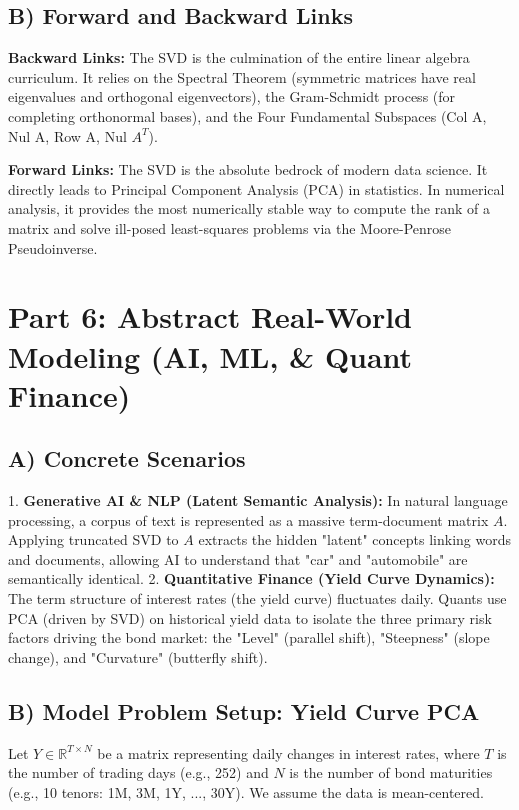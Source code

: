 \documentclass[11pt, letterpaper]{article}
\theoremstyle{definition}
\theoremstyle{remark}
\newcommand{\R}{\mathbb{R}}
\begin{document}
\subsection{B) Forward and Backward Links}
\textbf{Backward Links:} The SVD is the culmination of the entire linear algebra curriculum. It relies on the Spectral Theorem (symmetric matrices have real eigenvalues and orthogonal eigenvectors), the Gram-Schmidt process (for completing orthonormal bases), and the Four Fundamental Subspaces (Col A, Nul A, Row A, Nul $A^T$).

\textbf{Forward Links:} The SVD is the absolute bedrock of modern data science. It directly leads to Principal Component Analysis (PCA) in statistics. In numerical analysis, it provides the most numerically stable way to compute the rank of a matrix and solve ill-posed least-squares problems via the Moore-Penrose Pseudoinverse.

\newpage
\section{Part 6: Abstract Real-World Modeling (AI, ML, \& Quant Finance)}

\subsection{A) Concrete Scenarios}
1. \textbf{Generative AI \& NLP (Latent Semantic Analysis):} In natural language processing, a corpus of text is represented as a massive term-document matrix $A$. Applying truncated SVD to $A$ extracts the hidden "latent" concepts linking words and documents, allowing AI to understand that "car" and "automobile" are semantically identical.
2. \textbf{Quantitative Finance (Yield Curve Dynamics):} The term structure of interest rates (the yield curve) fluctuates daily. Quants use PCA (driven by SVD) on historical yield data to isolate the three primary risk factors driving the bond market: the "Level" (parallel shift), "Steepness" (slope change), and "Curvature" (butterfly shift).

\subsection{B) Model Problem Setup: Yield Curve PCA}
Let $Y \in \R^{T \times N}$ be a matrix representing daily changes in interest rates, where $T$ is the number of trading days (e.g., 252) and $N$ is the number of bond maturities (e.g., 10 tenors: 1M, 3M, 1Y, ..., 30Y). We assume the data is mean-centered.
\end{document}
